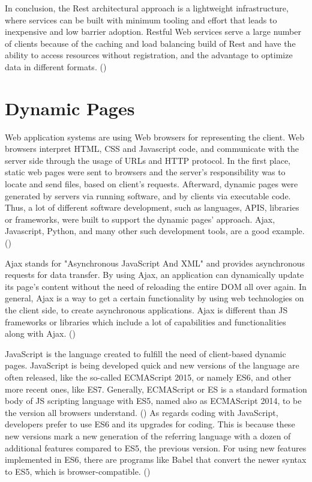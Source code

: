 In conclusion, the Rest architectural approach is a lightweight infrastructure, where services can be built with minimum tooling and effort that leads to inexpensive and low barrier adoption. Restful Web services serve a large number of clients because of the caching and load balancing build of Rest and have the ability to access resources without registration, and the advantage to optimize data in different formats. (\cite{Reference8}) \par

\section{Dynamic Pages}

Web application systems are using Web browsers for representing the client. Web browsers interpret HTML, CSS and Javascript code, and communicate with the server side through the usage of URLs and HTTP protocol. In the first place, static web pages were sent to browsers and the server's responsibility was to locate and send files, based on client's requests. Afterward, dynamic pages were generated by servers via running software, and by clients via executable code. Thus, a lot of different software development, such as languages, APIS, libraries or frameworks, were built to support the dynamic pages' approach. Ajax, Javascript, Python, and many other such development tools, are a good example. (\cite{Reference4}) \par

Ajax stands for "Asynchronous JavaScript And XML" and provides asynchronous requests for data transfer. By using Ajax, an application can dynamically update its page's content without the need of reloading the entire DOM all over again. In general, Ajax is a way to get a certain functionality by using web technologies on the client side, to create asynchronous applications. Ajax is different than JS frameworks or libraries which include a lot of capabilities and functionalities along with Ajax. (\cite{Reference17}) \par

JavaScript is the language created to fulfill the need of client-based dynamic pages. JavaScript is being developed quick and new versions of the language are often released, like the so-called ECMAScript 2015, or namely ES6, and other more recent ones, like ES7. Generally, ECMAScript or ES is a standard formation body of JS scripting language with ES5, named also as ECMAScript 2014, to be the version all browsers understand. (\cite{Reference10}) As regards coding with JavaScript, developers prefer to use ES6 and its upgrades for coding. This is because these new versions mark a new generation of the referring language with a dozen of additional features compared to ES5, the previous version. For using new features implemented in ES6, there are programs like Babel that convert the newer syntax to ES5, which is browser-compatible. (\cite{Reference13}) \par

